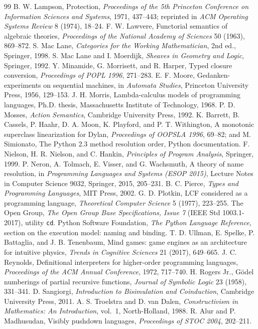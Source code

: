 \begin{thebibliography}{99}
 B. W. Lampson, Protection, \emph{Proceedings of the 5th Princeton Conference on Information Sciences and Systems}, 1971, 437--443; reprinted in \emph{ACM Operating Systems Review} 8 (1974), 18--24.
 F. W. Lawvere, Functorial semantics of algebraic theories, \emph{Proceedings of the National Academy of Sciences} 50 (1963), 869--872.
 S. Mac Lane, \emph{Categories for the Working Mathematician}, 2nd ed., Springer, 1998.
 S. Mac Lane and I. Moerdijk, \emph{Sheaves in Geometry and Logic}, Springer, 1992.
 Y. Minamide, G. Morrisett, and R. Harper, Typed closure conversion, \emph{Proceedings of POPL 1996}, 271--283.
 E. F. Moore, Gedanken-experiments on sequential machines, in \emph{Automata Studies}, Princeton University Press, 1956, 129--153.
 J. H. Morris, Lambda-calculus models of programming languages, Ph.D. thesis, Massachusetts Institute of Technology, 1968.
 P. D. Mosses, \emph{Action Semantics}, Cambridge University Press, 1992.
 K. Barrett, B. Cassels, P. Haahr, D. A. Moon, K. Playford, and P. T. Withington, A monotonic superclass linearization for Dylan, \emph{Proceedings of OOPSLA 1996}, 69--82; and M. Simionato, The Python 2.3 method resolution order, Python documentation.
 F. Nielson, H. R. Nielson, and C. Hankin, \emph{Principles of Program Analysis}, Springer, 1999.
 P. Neron, A. Tolmach, E. Visser, and G. Wachsmuth, A theory of name resolution, in \emph{Programming Languages and Systems (ESOP 2015)}, Lecture Notes in Computer Science 9032, Springer, 2015, 205--231.
 B. C. Pierce, \emph{Types and Programming Languages}, MIT Press, 2002.
 G. D. Plotkin, LCF considered as a programming language, \emph{Theoretical Computer Science} 5 (1977), 223--255.
 The Open Group, \emph{The Open Group Base Specifications, Issue 7} (IEEE Std 1003.1-2017), utility \texttt{cd}.
 Python Software Foundation, \emph{The Python Language Reference}, section on the execution model: naming and binding.
 T. D. Ullman, E. Spelke, P. Battaglia, and J. B. Tenenbaum, Mind games: game engines as an architecture for intuitive physics, \emph{Trends in Cognitive Sciences} 21 (2017), 649--665.
 J. C. Reynolds, Definitional interpreters for higher-order programming languages, \emph{Proceedings of the ACM Annual Conference}, 1972, 717--740.
 H. Rogers Jr., G\"odel numberings of partial recursive functions, \emph{Journal of Symbolic Logic} 23 (1958), 331--341.
 D. Sangiorgi, \emph{Introduction to Bisimulation and Coinduction}, Cambridge University Press, 2011.
 A. S. Troelstra and D. van Dalen, \emph{Constructivism in Mathematics: An Introduction}, vol.~1, North-Holland, 1988.
 R. Alur and P. Madhusudan, Visibly pushdown languages, \emph{Proceedings of STOC 2004}, 202--211.
\end{thebibliography}
